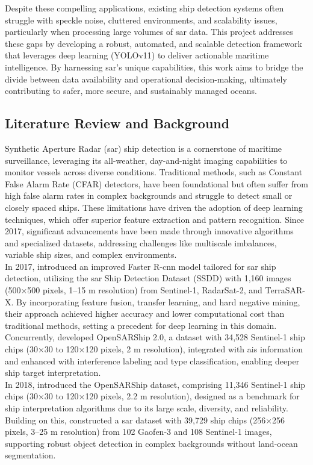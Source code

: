\documentclass{article}
\begin{document}
Despite these compelling applications, existing ship detection systems often struggle with speckle noise, cluttered environments, and scalability issues, particularly when processing large volumes of \acrshort{sar} data. This project addresses these gaps by developing a robust, automated, and scalable detection framework that leverages deep learning (YOLOv11) to deliver actionable maritime intelligence. By harnessing \acrshort{sar}’s unique capabilities, this work aims to bridge the divide between data availability and operational decision-making, ultimately contributing to safer, more secure, and sustainably managed oceans. \subsection{Literature Review and Background}
Synthetic Aperture Radar (\acrshort{sar}) ship detection is a cornerstone of maritime surveillance, leveraging its all-weather, day-and-night imaging capabilities to monitor vessels across diverse conditions. Traditional methods, such as Constant False Alarm Rate (CFAR) detectors, have been foundational but often suffer from high false alarm rates in complex backgrounds and struggle to detect small or closely spaced ships. These limitations have driven the adoption of deep learning techniques, which offer superior feature extraction and pattern recognition. Since 2017, significant advancements have been made through innovative algorithms and specialized datasets, addressing challenges like multiscale imbalances, variable ship sizes, and complex environments. \\

In 2017, \cite{8124934} introduced an improved Faster R-\acrshort{cnn} model tailored for \acrshort{sar} ship detection, utilizing the \acrshort{sar} Ship Detection Dataset (SSDD) with 1,160 images (500×500 pixels, 1–15 m resolution) from Sentinel-1, RadarSat-2, and TerraSAR-X. By incorporating feature fusion, transfer learning, and hard negative mining, their approach achieved higher accuracy and lower computational cost than traditional methods, setting a precedent for deep learning in this domain. Concurrently, \cite{8067489} developed OpenSARShip 2.0, a dataset with 34,528 Sentinel-1 ship chips (30×30 to 120×120 pixels, 2 m resolution), integrated with \acrshort{ais} information and enhanced with interference labeling and type classification, enabling deeper ship target interpretation.\\

In 2018, \cite{8124929} introduced the OpenSARShip dataset, comprising 11,346 Sentinel-1 ship chips (30×30 to 120×120 pixels, 2.2 m resolution), designed as a benchmark for ship interpretation algorithms due to its large scale, diversity, and reliability. Building on this, \cite{rs11070765} constructed a \acrshort{sar} dataset with 39,729 ship chips (256×256 pixels, 3–25 m resolution) from 102 Gaofen-3 and 108 Sentinel-1 images, supporting robust object detection in complex backgrounds without land-ocean segmentation. \\
\end{document}
